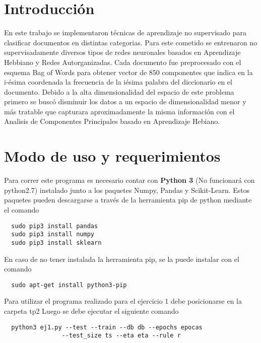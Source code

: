 \section{Introducción}

En este trabajo se implementaron técnicas de aprendizaje no supervisado para
clasificar documentos en distintas categorias. Para este cometido se entrenaron no
supervisadamente diversos tipos de redes neuronales basados en Aprendizaje Hebbiano y
Redes Autorganizadas. Cada documento fue preprocesado con el esquema Bag of
Words para obtener vector de 850 componentes que indica en la i-ésima coordenada
la frecuencia de la iésima palabra del diccionario en el documento.
Debido a la alta dimensionalidad del espacio de este problema primero se buscó
disminuir los datos a un espacio de dimensionalidad menor y más tratable que
capturara aproximadamente la misma información con el Analisis de Componentes
Principales basado en Aprendizaje Hebiano.


\section{Modo de uso y requerimientos}
Para correr este programa es necesario contar con \textbf{Python 3} (No funcionará con python2.7) instalado junto a los paquetes Numpy, Pandas y Scikit-Learn. Estos paquetes pueden descargarse a través
de la herramienta pip de python mediante el comando
\begin{verbatim}
  sudo pip3 install pandas
  sudo pip3 install numpy
  sudo pip3 install sklearn
\end{verbatim}
En caso de no tener instalada la herramienta pip, se la puede instalar con el comando
\begin{verbatim}
  sudo apt-get install python3-pip
\end{verbatim}

Para utilizar el programa realizado para el ejercicio 1 debe posicionarse en la carpeta tp2 Luego se debe ejecutar el siguiente comando
\begin{verbatim}
  python3 ej1.py --test --train --db db --epochs epocas
                --test_size ts --eta eta --rule r
\end{verbatim}

